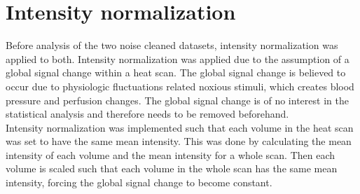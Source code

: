 \section{Intensity normalization}

Before analysis of the two noise cleaned datasets, intensity normalization was applied to both. Intensity normalization was applied due to the assumption of a global signal change within a heat scan. The global signal change is believed to occur due to physiologic fluctuations related noxious stimuli, which creates blood pressure and perfusion changes. The global signal change is of no interest in the statistical analysis and therefore needs to be removed beforehand. \cite{Macey2004} \\
Intensity normalization was implemented such that each volume in the heat scan was set to have the same mean intensity. This was done by calculating the mean intensity of each volume and the mean intensity for a whole scan. Then each volume is scaled such that each volume in the whole scan has the same mean intensity, forcing the global signal change to become constant.  